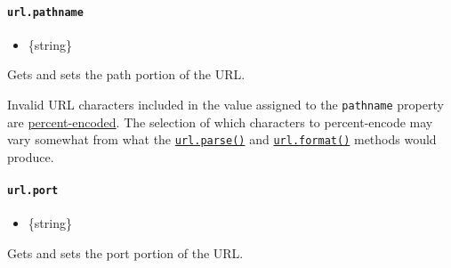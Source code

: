 \paragraph{\texorpdfstring{\texttt{url.pathname}}{url.pathname}}\label{url.pathname}

\begin{itemize}
\tightlist
\item
  \{string\}
\end{itemize}

Gets and sets the path portion of the URL.

\begin{Shaded}
\begin{Highlighting}[]
\OperatorTok{=}  \NormalTok{(}\NormalTok{)}\OperatorTok{;}
\NormalTok{)}\OperatorTok{;}

 \OperatorTok{=} \OperatorTok{;}
\NormalTok{)}\OperatorTok{;}
\end{Highlighting}
\end{Shaded}

Invalid URL characters included in the value assigned to the
\texttt{pathname} property are
\hyperref[percent-encoding-in-urls]{percent-encoded}. The selection of
which characters to percent-encode may vary somewhat from what the
\hyperref[urlparseurlstring-parsequerystring-slashesdenotehost]{\texttt{url.parse()}}
and \hyperref[urlformaturlobject]{\texttt{url.format()}} methods would
produce.

\paragraph{\texorpdfstring{\texttt{url.port}}{url.port}}\label{url.port}

\begin{itemize}
\tightlist
\item
  \{string\}
\end{itemize}

Gets and sets the port portion of the URL.


